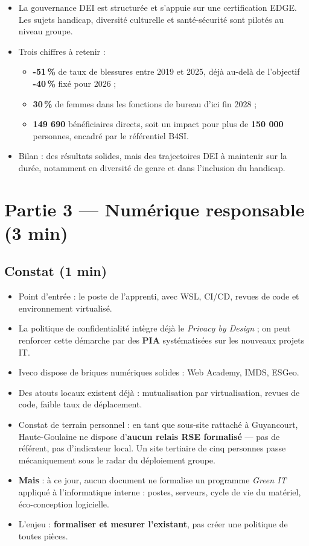 \documentclass[12pt,a4paper]{article}
\begin{document}
\begin{itemize}
  \item La gouvernance DEI est structurée et s'appuie sur une certification EDGE. Les sujets handicap, diversité culturelle et santé-sécurité sont pilotés au niveau groupe.
  \item Trois chiffres à retenir :
  \begin{itemize}[label=--]
    \item \textbf{-51\,\%} de taux de blessures entre 2019 et 2025, déjà au-delà de l'objectif \textbf{-40\,\%} fixé pour 2026 ;
    \item \textbf{30\,\%} de femmes dans les fonctions de bureau d'ici fin 2028 ;
    \item \textbf{149 690} bénéficiaires directs, soit un impact pour plus de \textbf{150 000} personnes, encadré par le référentiel B4SI.
  \end{itemize}
  \item Bilan : des résultats solides, mais des trajectoires DEI à maintenir sur la durée, notamment en diversité de genre et dans l'inclusion du handicap.
\end{itemize}

\section*{Partie 3 --- Numérique responsable (3 min)}

\subsection*{Constat (1 min)}

\begin{itemize}
  \item Point d'entrée : le poste de l'apprenti, avec WSL, CI/CD, revues de code et environnement virtualisé.
  \item La politique de confidentialité intègre déjà le \textit{Privacy by Design} ; on peut renforcer cette démarche par des \textbf{PIA} systématisées sur les nouveaux projets IT.
  \item Iveco dispose de briques numériques solides : Web Academy, IMDS, ESGeo.
  \item Des atouts locaux existent déjà : mutualisation par virtualisation, revues de code, faible taux de déplacement.
  \item Constat de terrain personnel : en tant que sous-site rattaché à Guyancourt, Haute-Goulaine ne dispose d'\textbf{aucun relais RSE formalisé} --- pas de référent, pas d'indicateur local. Un site tertiaire de cinq personnes passe mécaniquement sous le radar du déploiement groupe.
  \item \textbf{Mais} : à ce jour, aucun document ne formalise un programme \textit{Green IT} appliqué à l'informatique interne : postes, serveurs, cycle de vie du matériel, éco-conception logicielle.
  \item L'enjeu : \textbf{formaliser et mesurer l'existant}, pas créer une politique de toutes pièces.
\end{itemize}
\end{document}
